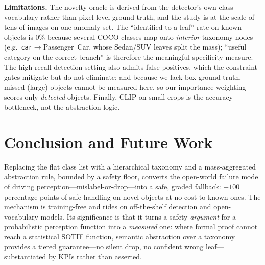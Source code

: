 \documentclass[conference]{IEEEtran}
\begin{document}
\textbf{Limitations.} The novelty oracle is derived from the detector's own class
vocabulary rather than pixel-level ground truth, and the study is at the scale of
tens of images on one anomaly set. The ``identified-to-a-leaf'' rate on known
objects is $0\%$ because several COCO classes map onto \emph{interior} taxonomy
nodes (e.g.\ \texttt{car}$\rightarrow$\textsf{Passenger~Car}, whose Sedan/SUV
leaves split the mass); ``useful category on the correct branch'' is therefore
the meaningful specificity measure. The high-recall detection setting also admits
false positives, which the constraint gates mitigate but do not eliminate; and
because we lack box ground truth, missed (large) objects cannot be measured here,
so our importance weighting scores only \emph{detected} objects. Finally, CLIP on
small crops is the accuracy bottleneck, not the abstraction logic.

\section{Conclusion and Future Work}
\label{sec:conclusion}

Replacing the flat class list with a hierarchical taxonomy and a mass-aggregated
abstraction rule, bounded by a safety floor, converts the open-world failure mode
of driving perception---mislabel-or-drop---into a safe, graded fallback:
$+100$ percentage points of safe handling on novel objects at no cost to known
ones. The mechanism is training-free and rides on off-the-shelf detection and
open-vocabulary models. Its significance is that it turns a safety
\emph{argument} for a probabilistic perception function into a \emph{measured}
one: where formal proof cannot reach a statistical SOTIF function, semantic
abstraction over a taxonomy provides a tiered guarantee---no silent drop, no
confident wrong leaf---substantiated by KPIs rather than asserted.
\end{document}
